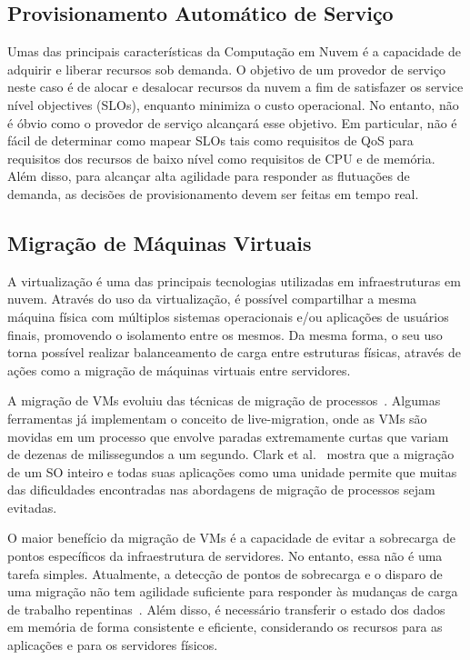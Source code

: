 	\subsection{Provisionamento Automático de Serviço}
	Umas das principais características da Computação em Nuvem é a capacidade de adquirir e liberar recursos sob demanda. O objetivo de um provedor de serviço neste caso é de alocar e desalocar recursos da nuvem a fim de satisfazer os service nível objectives (SLOs), enquanto minimiza o custo operacional.  No entanto, não é óbvio como o provedor de serviço alcançará esse objetivo. Em particular, não é fácil de determinar como mapear SLOs tais como requisitos de QoS para requisitos dos recursos de baixo nível como requisitos de CPU e de memória. Além disso, para alcançar alta agilidade para responder as flutuações de demanda, as decisões de provisionamento devem ser feitas em tempo real.
	
	\subsection{Migração de Máquinas Virtuais}
	A virtualização é uma das principais tecnologias utilizadas em infraestruturas em nuvem. Através do uso da virtualização, é possível compartilhar a mesma máquina física com múltiplos sistemas operacionais e/ou aplicações de usuários finais, promovendo o isolamento entre os mesmos. Da mesma forma, o seu uso torna possível realizar balanceamento de carga entre estruturas físicas, através de ações como a migração de máquinas virtuais entre servidores.
	
	A migração de VMs evoluiu das técnicas de migração de processos~\cite{Osman:2002}. Algumas ferramentas já implementam o conceito de live-migration, onde as VMs são movidas em um processo que envolve paradas extremamente curtas que variam de dezenas de milissegundos a um segundo. Clark et al.~\citeyearpar{Clark:2005} mostra que a migração de um SO inteiro e todas suas aplicações como uma unidade permite que muitas das dificuldades encontradas nas abordagens de migração de processos sejam evitadas.
	 
	O maior benefício da migração de VMs é a capacidade de evitar a sobrecarga de pontos específicos da infraestrutura de servidores. No entanto, essa não é uma tarefa simples. Atualmente, a detecção de pontos de sobrecarga e o disparo de uma migração não tem agilidade suficiente para responder às mudanças de carga de trabalho repentinas~\cite{stateOfArt:2010}. Além disso, é necessário transferir o estado dos dados em memória de forma consistente e eficiente, considerando os recursos para as aplicações e para os servidores físicos.
	
